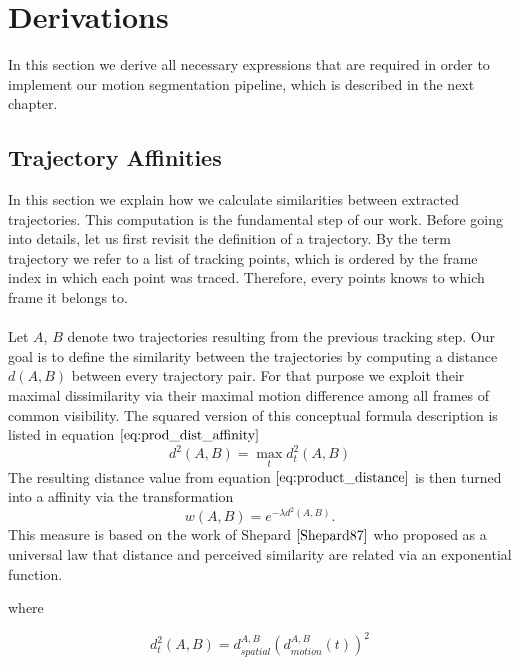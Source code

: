 
\chapter{Derivations}
In this section we derive all necessary expressions that are required in order to implement our motion segmentation pipeline, which is described in the next chapter.

\section{Trajectory Affinities}
\label{sec:trajectory_affinities}
In this section we explain how we calculate similarities between extracted trajectories. This computation is the fundamental step of our work.
Before going into details, let us first revisit the definition of a trajectory. By the term trajectory we refer to a list of tracking points, which is ordered by the frame index in which each point was traced. Therefore, every points knows to which frame it belongs to. \\ \\
Let $A$, $B$ denote two trajectories resulting from the previous tracking step. Our goal is to define the similarity between the trajectories by computing a distance $d(A,B)$ between every trajectory pair. For that purpose we exploit their maximal dissimilarity via their maximal motion difference among all frames of common visibility. The squared version of this conceptual formula description is listed in equation $\ref{eq:prod_dist_affinity}$ 
\begin{equation}
	d^2 \left( A, B \right) = \max_t d_t^2 \left( A, B \right)
	\label{eq:product_distance}
\end{equation}
The resulting distance value from equation $\ref{eq:product_distance}$ is then turned into a affinity via the transformation
\begin{equation}
	w \left( A, B \right) = e^{ -\lambda d^2 (A, B) }.
	\label{eq:prod_dist_affinity}
\end{equation}
This measure is based on the work of Shepard $\cite{Shepard87}$ who proposed as a universal law that distance and perceived similarity are related via an exponential function.


where

\begin{equation}
	d_t^2 \left( A, B \right) = d_{spatial}^{A,B} \left( d_{motion}^{A,B} (t) \right) ^2
\end{equation}

